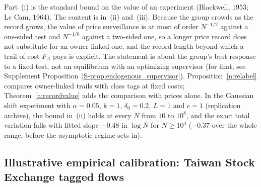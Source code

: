 \documentclass[11pt,letterpaper]{article}
\theoremstyle{definition}
\begin{document}
Part~(i) is the standard bound on the value of an experiment (Blackwell, 1953; Le Cam, 1964). The content is in~(ii) and~(iii). Because the group crowds as the record grows, the value of price surveillance is at most of order $N^{-1/2}$ against a one-sided test and $N^{-1/6}$ against a two-sided one, so a longer price record does not substitute for an owner-linked one, and the record length beyond which a trail of cost $F_A$ pays is explicit. The statement is about the group's best response to a fixed test, not an equilibrium with an optimizing supervisor (for that, see Supplement Proposition~\ref{S-prop:endogenous_supervisor}). Proposition~\ref{n:relabel} compares owner-linked trails with class tags at fixed costs; Theorem~\ref{n:recordvalue} adds the comparison with prices alone. In the Gaussian shift experiment with $\alpha = 0.05$, $k = 1$, $\delta_0 = 0.2$, $L = 1$ and $c = 1$ (replication archive), the bound in~(ii) holds at every $N$ from $10$ to $10^8$, and the exact total variation falls with fitted slope $-0.48$ in $\log N$ for $N \ge 10^4$ ($-0.37$ over the whole range, before the asymptotic regime sets in).


\subsection{Illustrative empirical calibration: Taiwan Stock Exchange tagged flows}\label{sec:taiwan}
\end{document}
